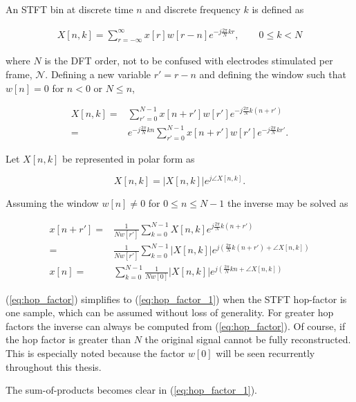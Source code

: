 \documentclass [11pt, proquest,oneside] {ganter_thesis}[2015/03/03]
\begin{document}
An STFT bin at discrete time $n$ and discrete frequency $k$ is defined as

\begin{align}
\label{eq:STFTdefinition}
X[n,k] = \sum\limits_{r=-\infty}^{\infty} x[r] w[r - n] e^{-j\frac{2\pi}{N}kr}, \qquad 0 \leq k < N
\end{align}

where $N$ is the DFT order, not to be confused with electrodes stimulated per frame, $\mathcal{N}$.  Defining a new variable $r' = r - n$ and defining the window such that  $w[n] = 0$ for $n < 0$ or $N \leq n$,

\begin{align}
X[n,k] =& \sum\limits_{r'=0}^{N-1} x[n + r'] w[r'] e^{-j\frac{2\pi}{N}k(n + r')} \nonumber \\
=& e^{-j\frac{2\pi}{N}kn} \sum\limits_{r'=0}^{N-1} x[n + r'] w[r'] e^{-j\frac{2\pi}{N}kr'}.
\end{align}

Let $X[n,k]$ be represented in polar form as

\begin{equation}
X[n,k] = \vert X[n,k]\vert e^{j\angle X[n,k]}.
\end{equation}

Assuming the window $w[n] \neq 0$ for $0 \leq n \leq N-1$ the inverse may be solved as

\begin{align}
\label{eq:hop_factor}
x[n + r'] =& \frac{1}{Nw[r']}  \sum\limits_{k=0}^{N-1} X[n,k] e^{j\frac{2\pi}{N}k(n+r')} \nonumber \\
=& \frac{1}{Nw[r']}  \sum\limits_{k=0}^{N-1} \vert X[n,k]\vert e^{j(\frac{2\pi}{N}k(n+r') + \angle X[n,k])} \\
\label{eq:hop_factor_1}
x[n] =&\sum\limits_{k=0}^{N-1}  \frac{1}{Nw[0]}  \vert X[n,k]\vert e^{j(\frac{2\pi}{N}kn + \angle X[n,k])}
\end{align}

(\ref{eq:hop_factor}) simplifies to (\ref{eq:hop_factor_1}) when the STFT hop-factor is one sample, which can be assumed without loss of generality.  For greater hop factors the inverse can always be computed from (\ref{eq:hop_factor}).  Of course, if the hop factor is greater than $N$ the original signal cannot be fully reconstructed.  This is especially noted because the factor $w[0]$ will be seen recurrently throughout this thesis.

The sum-of-products becomes clear in (\ref{eq:hop_factor_1}).
\end{document}
